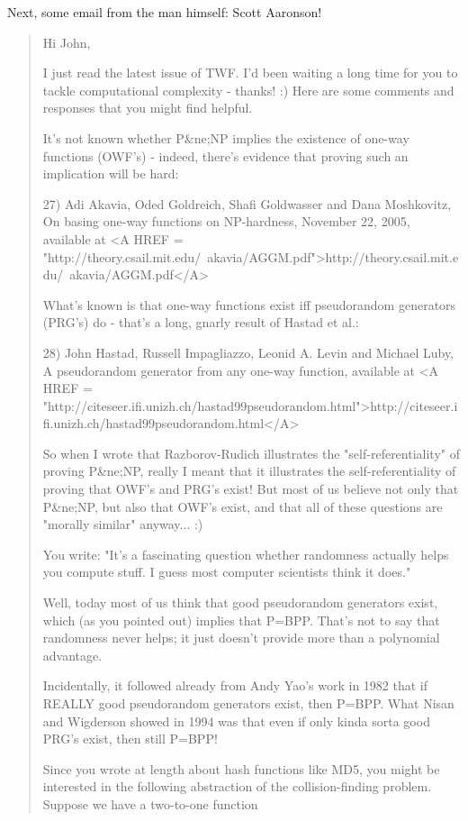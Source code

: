 Next, some email from the man himself: Scott Aaronson!

\begin{quote}
  Hi John,

  I just read the latest issue of TWF.  I'd been waiting a long time for you 
  to tackle computational complexity - thanks! :)  Here are some comments 
  and responses that you might find helpful.

  It's not known whether P&ne;NP implies the existence of one-way functions 
  (OWF's) - indeed, there's evidence that proving such an implication 
  will be hard:


27) Adi Akavia, Oded Goldreich, Shafi Goldwasser and Dana Moshkovitz,
  On basing one-way functions on NP-hardness, November 22, 2005, available
  at
  <A HREF = "http://theory.csail.mit.edu/~akavia/AGGM.pdf">http://theory.csail.mit.edu/~akavia/AGGM.pdf</A>

  What's known is that one-way functions exist iff pseudorandom generators 
  (PRG's) do - that's a long, gnarly result of Hastad et al.:

  28) John Hastad, Russell Impagliazzo, Leonid A. Levin and Michael Luby,
A pseudorandom generator from any one-way function, available
at <A HREF = "http://citeseer.ifi.unizh.ch/hastad99pseudorandom.html">http://citeseer.ifi.unizh.ch/hastad99pseudorandom.html</A>

  So when I wrote that Razborov-Rudich illustrates the "self-referentiality" 
  of proving P&ne;NP, really I meant that it illustrates the self-referentiality 
  of proving that OWF's and PRG's exist!  But most of us believe not only 
  that P&ne;NP, but also that OWF's exist, and that all of these questions 
  are "morally similar" anyway... :)

  You write: "It's a fascinating question whether randomness actually helps 
  you compute stuff. I guess most computer scientists think it does."

  Well, today most of us think that good pseudorandom generators exist, 
  which (as you pointed out) implies that P=BPP.  That's not to say that 
  randomness never helps; it just doesn't provide more than a polynomial 
  advantage.

  Incidentally, it followed already from Andy Yao's work in 1982 that if 
  REALLY good pseudorandom generators exist, then P=BPP.  What Nisan and 
  Wigderson showed in 1994 was that even if only kinda sorta good PRG's 
  exist, then still P=BPP!

  Since you wrote at length about hash functions like MD5, you might be 
  interested in the following abstraction of the collision-finding problem.  
  Suppose we have a two-to-one function 
 

\end{quote}
